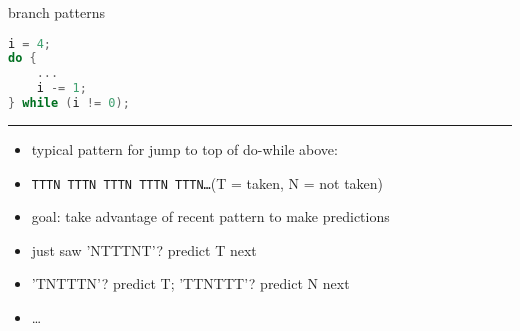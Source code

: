 \usetikzlibrary{arrows.meta,fit,matrix,positioning,shapes.callouts}

\begin{frame}[fragile,label=branchPattern]{branch patterns}
\begin{lstlisting}[language=C]
i = 4;
do {
    ...
    i -= 1;
} while (i != 0);
\end{lstlisting}
\hrule
\begin{itemize}
\item typical pattern for jump to top of do-while above: 
\item \texttt{TTTN TTTN TTTN TTTN TTTN\ldots}{\small (T = taken, N = not taken)}
\item goal: take advantage of recent pattern to make predictions
\item just saw 'NTTTNT'? predict T next
\item 'TNTTTN'? predict T; 'TTNTTT'? predict N next
\item \ldots
\end{itemize}
\end{frame}

